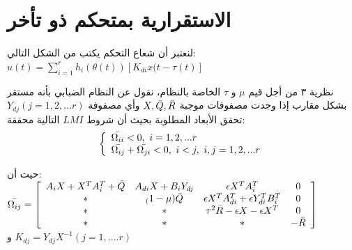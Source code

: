 \documentclass[dvipsnames,mathserif]{beamer}
\begin{document}
{\section{الاستقرارية بمتحكم ذو تأخر}
\begin{frame}   
\footnotesize
لنعتبر أن شعاع التحكم يكتب من الشكل التالي:
$u(t)=\sum_{i=1}^{r} h_{i}(\theta(t))[K_{di}x(t-\tau(t)]$  
\begin{block}{نظرية ٣}
من أجل قيم $\mu$ و $\tau$ الخاصة بالنظام، نقول عن النظام  الضبابي بأنه مستقر بشكل مقارب  إذا وجدت مصفوفات موجبة $X,\Bar{Q},\Bar{R}$ وأي مصفوفة $Y_{dj}(j=1,2,...r)$ تحقق الأبعاد المطلوبة بحيث أن شروط $LMI$ التالية محققة:
\begin{equation*}
\left\{\begin{array}{l}
  \Bar{\Omega_{ii}}< 0,\ i=1,2,...r \\
    \Bar{\Omega_{ij}}+\Bar{\Omega_{ji}}<0,\ i<j ,\ i,j=1,2,...r
\end{array}\right.
\end{equation*}
\end{block}
حيث أن:\\
$ \Bar{\Omega_{ij}}=\left[\begin{array}{cccc}
A_iX+X^TA_i^T+\Bar{Q}& A_{di}X+B_iY_{dj}& \epsilon X^T A_i^T & 0 \\ *& _(1-\mu)\Bar{Q}& \epsilon X^T A_{di}^T+\epsilon Y_{di}^TB_i^T & 0\\ *&*&\tau^2\Bar{R}-\epsilon X-\epsilon X^T & 0\\ *&*&*&-\Bar{R}
\end{array}\right]$  \\ و
  $K_{dj}=Y_{dj}X^{-1}(j=1,....r)$
\end{frame}
}
\end{document}
